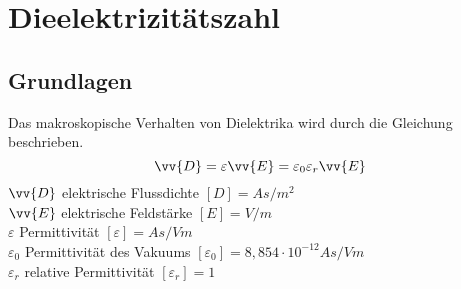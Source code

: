 \documentclass[a4paper,twoside,12pt,DIV=13,BCOR=5mm,numbers=noenddot,cleardoublepage=empty]{scrbook}
\begin{document}
    \chapter{Dieelektrizit\"atszahl}
    \section{Grundlagen}
    Das makroskopische Verhalten von Dielektrika wird durch die Gleichung beschrieben.
    \begin{equation}
    \vv{D}=\varepsilon\vv{E}=\varepsilon_{0}\varepsilon_{r}\vv{E}
    \end{equation}
    $\vv{D}$ elektrische Flussdichte $[D]=As/m^{2}$ \\
    $\vv{E}$ elektrische Feldst\"arke $[E]=V/m$ \\
    $\varepsilon$ Permittivit\"at $[\varepsilon]=As/Vm$ \\
    $\varepsilon_{0}$ Permittivit\"at des Vakuums $[\varepsilon_{0}]=8,854\cdot10^{-12} As/Vm$ \\
    $\varepsilon_{r}$ relative Permittivit\"at $[\varepsilon_{r}]=1$ \\
    
\end{document}
